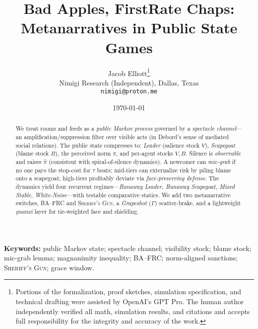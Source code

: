 \documentclass[11pt]{article}
\title{Bad Apples, First\textemdash Rate Chaps:\\
Metanarratives in Public State Games}
\author{Jacob Elliott\thanks{Portions of the formalization, proof sketches, simulation specification, and technical drafting were assisted by OpenAI's GPT\textendash 5 Pro. The human author independently verified all math, simulation results, and citations and accepts full responsibility for the integrity and accuracy of the work.}\\[4pt]
\small Nimigi Research (Independent), Dallas, Texas\\
\small \texttt{nimigi@proton.me}}
\date{\today}
\theoremstyle{definition}
\newcommand{\BAFRC}{\textsc{BA--FRC}} %
\newcommand{\Sheriff}{\textsc{Sheriff's Gun}}
\begin{document}
\maketitle

\begin{abstract}
We treat rooms and feeds as a \emph{public Markov process} governed by a \emph{spectacle channel}---an amplification/suppression filter over visible acts (in Debord's sense of mediated social relations). The public state compresses to: \emph{Leader} (salience stock $V$), \emph{Scapegoat} (blame stock $B$), the perceived norm $\pi$, and per\hyp{}agent stocks $V,B$. Silence is \emph{observable} and raises $\hat{\pi}$ (consistent with spiral\hyp of\hyp silence dynamics). A newcomer can \emph{mic\hyp grab} if no one pays the stop\hyp cost for $\tau$ beats; mid\hyp tiers can externalize risk by piling blame onto a scapegoat; high\hyp tiers profitably deviate via \emph{face\hyp preserving defense}. The dynamics yield four recurrent regimes---\emph{Runaway Leader, Runaway Scapegoat, Mixed Stable, White\hyp Noise}---with testable comparative statics. We add two metanarrative switches, \BAFRC{} and \Sheriff{}, a \emph{Grapeshot} ($\Gamma$) scatter\hyp brake, and a lightweight \emph{guanxi} layer for tie\hyp weighted face and shielding.
\end{abstract}

\noindent\textbf{Keywords:} public Markov state; spectacle channel; visibility stock; blame stock; mic\hyp grab lemma; magnanimity inequality; \BAFRC; norm\hyp aligned sanctions; \Sheriff; grace window.

\end{document}

